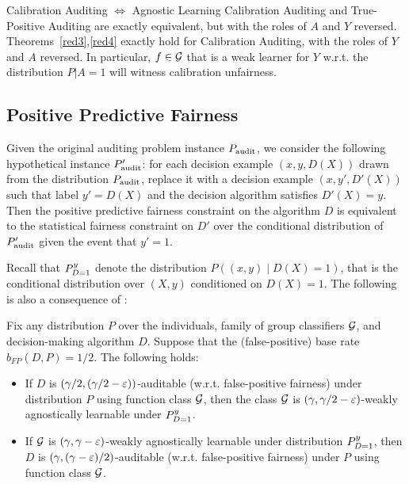\begin{remark}{Calibration Auditing $\Leftrightarrow$ Agnostic Learning}
Calibration Auditing and True-Positive Auditing are exactly equivalent, but with the roles of $A$ and $Y$ reversed. Theorems~\ref{red3},\ref{red4} exactly hold for Calibration Auditing, with the roles of $Y$ and $A$ reversed. In particular, $f \in \mathcal{G}$ that is a weak learner for $Y$ w.r.t. the distribution $P|A = 1$ will witness calibration unfairness.
\end{remark}
\fi


\iffalse
\subsection{Positive Predictive Fairness}
Given the original auditing problem instance $P_\mathrm{audit}$, we consider the
following hypothetical instance $P_\mathrm{audit}'$: for each decision example
$(x, y, D(X))$ drawn from the distribution $P_\mathrm{audit}$, replace it with a
decision example $(x, y', D'(X))$ such that label $y' = D(X)$ and the
decision algorithm satisfies $D'(X) = y$.  Then the positive
predictive fairness constraint on the algorithm $D$ is equivalent to
the statistical fairness constraint on $D'$ over the conditional
distribution of $P_\mathrm{audit}'$ given the event that $y' = 1$.

Recall that $P_{D=1}^y$ denote the distribution $P((x, y) \mid D(X) = 1)$,
that is the conditional distribution over $(X, y)$ conditioned on
$D(X) = 1$. The following is also a consequence of
:

\begin{corollary}
  Fix any distribution $P$ over the individuals, family of group
  classifiers $\mathcal{G}$, and decision-making algorithm $D$.  Suppose that
  the (false-positive) base rate $b_{FP}(D, P) = 1/2$. The following
  holds:
\begin{itemize}
\item If $D$ is $(\gamma/2, (\gamma/2 - \varepsilon))$-auditable
  (w.r.t. false-positive fairness) under distribution $P$ using
  function class $\mathcal{G}$, then the class $\mathcal{G}$ is
  $(\gamma, \gamma/2 - \varepsilon)$-weakly agnostically learnable under
  $P_{D=1}^y$.
\item If $\mathcal{G}$ is $(\gamma, \gamma - \varepsilon)$-weakly agnostically
  learnable under distribution $P_{D=1}^y$, then $D$ is
  $(\gamma, (\gamma - \varepsilon)/2)$-auditable (w.r.t. false-positive
  fairness) under $P$ using function class $\mathcal{G}$.

\end{itemize}
\end{corollary}

